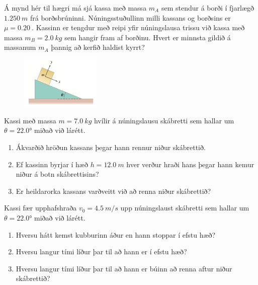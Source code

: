 \ifdefined \wholebook \else\documentclass[oneside]{book}\usepackage{EdlBook}\graphicspath{{figures/}}
\begin{document}
\begin{enumerate}[label = \textbf{Dæmi \thechapter.\arabic*.}]
\begin{minipage}{\linewidth}
\item Á mynd hér til hægri má sjá kassa með massa $m_A$ sem stendur á borði í fjarlægð $\SI{1.250}{m}$ frá borðsbrúninni. Núningsstuðullinn milli kassans og borðsins er $\mu = \SI{0.20}{}$. Kassinn er tengdur með reipi yfir núningslausa trissu við kassa með massa $m_B = \SI{2.0}{kg}$ sem hangir fram af borðinu. Hvert er minnsta gildið á massanum $m_A$ þannig að kerfið haldist kyrrt?

\end{minipage}

\vspace{0.3cm}

\begin{minipage}{\linewidth}
\begin{figure}
\includegraphics[width=1.5in]{images/skabr2.png}
\end{figure}

\item Kassi með massa $m = \SI{7.0}{kg}$ hvílir á núningslausu skábretti sem hallar um $\theta = \ang{22.0}$ miðað við lárétt.
\begin{enumerate}[label = \textbf{(\alph*)}]
    \item Ákvarðið hröðun kassans þegar hann rennur niður skábrettið.
    \item Ef kassinn byrjar í hæð $h = \SI{12.0}{m}$ hver verður hraði hans þegar hann kemur niður á botn skábrettisins?
    \item Er heildarorka kassans varðveitt við að renna niður skábrettið?
\end{enumerate}

\end{minipage}

\item Kassi fær upphafshraða $v_0 = \SI{4.5}{m/s}$ upp núningslaust skábretti sem hallar um $\theta = \ang{22.0}$ miðað við lárétt.
\begin{enumerate}[label = \textbf{(\alph*)}]
    \item Hversu hátt kemst kubburinn áður en hann stoppar í efstu hæð?
    \item Hversu langur tími líður þar til að hann er í efstu hæð?
    \item Hversu langur tími líður þar til að hann er búinn að renna aftur niður skábrettið?
\end{enumerate}


\end{enumerate}
\end{document}
